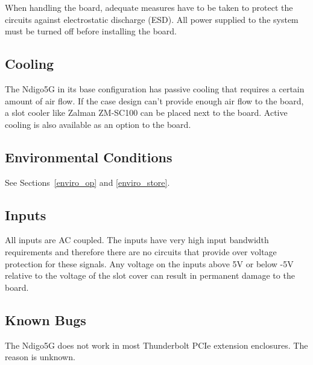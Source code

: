     When handling the board, adequate measures have to be taken to protect the circuits against electrostatic discharge (ESD). All power supplied to the system must be turned off before installing the board.

\subsection{Cooling}

    The Ndigo5G in its base configuration has passive cooling that requires a certain amount of air flow. If the case design can't provide enough air flow to the board, a slot cooler like Zalman ZM-SC100 can be placed next to the board. Active cooling is also available as an option to the board.

\subsection{Environmental Conditions}
    See Sections~\ref{enviro_op} and \ref{enviro_store}.

\subsection{Inputs}

    All inputs are AC coupled. The inputs have very high input bandwidth requirements and therefore there are no circuits that provide over voltage protection for these signals. Any voltage on the inputs above 5V or below -5V relative to the voltage of the slot cover can result in permanent damage to the board.

\subsection{Known Bugs}

    The Ndigo5G does not work in most Thunderbolt PCIe extension enclosures. The reason is unknown.

